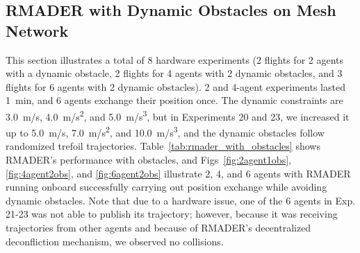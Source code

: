 \subsection{RMADER with Dynamic Obstacles on Mesh Network}
This section illustrates a total of 8 hardware experiments (2 flights for 2 agents with a dynamic obstacle, 2 flights for 4 agents with 2 dynamic obstacles, and 3 flights for 6 agents with 2 dynamic obstacles). 2 and 4-agent experiments lasted \SI{1}{\minute}, and 6 agents exchange their position once. The dynamic constraints are \SI{3.0}{m/s}, \SI{4.0}{m/s^2}, and \SI{5.0}{m/s^3}, but in Experiments 20 and 23, we increased it up to \SI{5.0}{m/s}, \SI{7.0}{m/s^2}, and \SI{10.0}{m/s^3}, and the dynamic obstacles follow randomized trefoil trajectories. 
Table~\ref{tab:rmader_with_obstacles} shows RMADER's performance with obstacles, and Figs~\ref{fig:2agent1obs}, \ref{fig:4agent2obs}, and \ref{fig:6agent2obs} illustrate 2, 4, and 6 agents with RMADER running onboard successfully carrying out position exchange while avoiding dynamic obstacles.    
Note that due to a hardware issue, one of the 6 agents in Exp. 21-23 was not able to publish its trajectory; however, because it was receiving trajectories from other agents and because of RMADER's decentralized deconfliction mechanism, we observed no collisions. 

\begin{table}
\caption{\centering Hardware experiments with dynamic obstacles}
\label{tab:rmader_with_obstacles}
\begin{centering}
\renewcommand{\arraystretch}{1.2}
\par\end{centering}
\end{table}


